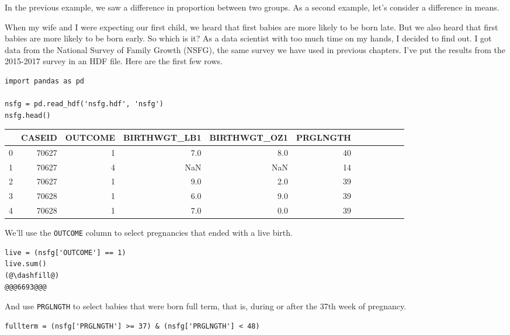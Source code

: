 In the previous example, we saw a difference in proportion between two
groups. As a second example, let's consider a difference in means.

When my wife and I were expecting our first child, we heard that first
babies are more likely to be born late. But we also heard that first
babies are more likely to be born early. So which is it? As a data
scientist with too much time on my hands, I decided to find out. I got
data from the National Survey of Family Growth (NSFG), the same survey
we have used in previous chapters. I've put the results from the
2015-2017 survey in an HDF file. Here are the first few rows.

\begin{lstlisting}[]
import pandas as pd

nsfg = pd.read_hdf('nsfg.hdf', 'nsfg')
nsfg.head()
\end{lstlisting}

\begin{tabular}{lrrrrrrrrrrr}
\midrule
{} &  CASEID &  OUTCOME &  BIRTHWGT\_LB1 &  BIRTHWGT\_OZ1 &  PRGLNGTH  \\
\midrule
0 &   70627 &        1 &           7.0 &           8.0 &        40  \\
1 &   70627 &        4 &           NaN &           NaN &        14  \\
2 &   70627 &        1 &           9.0 &           2.0 &        39  \\
3 &   70628 &        1 &           6.0 &           9.0 &        39  \\
4 &   70628 &        1 &           7.0 &           0.0 &        39  \\
\midrule
\end{tabular}

We'll use the \passthrough{\lstinline!OUTCOME!} column to select
pregnancies that ended with a live birth.

\begin{lstlisting}[]
live = (nsfg['OUTCOME'] == 1)
live.sum()
(@\dashfill@)
@@@6693@@@
\end{lstlisting}

And use \passthrough{\lstinline!PRGLNGTH!} to select babies that were
born full term, that is, during or after the 37th week of pregnancy.

\begin{lstlisting}[]
fullterm = (nsfg['PRGLNGTH'] >= 37) & (nsfg['PRGLNGTH'] < 48)
\end{lstlisting}

